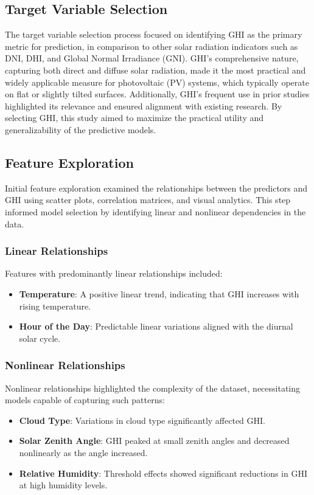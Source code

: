 \documentclass[10pt,twocolumn]{article}
\begin{document}
\begin{itemize}
\subsection{Target Variable Selection}
The target variable selection process focused on identifying GHI as the primary metric for prediction, in comparison to other solar radiation indicators such as DNI, DHI, and Global Normal Irradiance (GNI). GHI's comprehensive nature, capturing both direct and diffuse solar radiation, made it the most practical and widely applicable measure for photovoltaic (PV) systems, which typically operate on flat or slightly tilted surfaces\cite{6}. Additionally, GHI's frequent use in prior studies highlighted its relevance and ensured alignment with existing research. By selecting GHI, this study aimed to maximize the practical utility and generalizability of the predictive models.

\subsection{Feature Exploration}
Initial feature exploration examined the relationships between the predictors and GHI using scatter plots, correlation matrices, and visual analytics. This step informed model selection by identifying linear and nonlinear dependencies in the data.

\subsubsection{Linear Relationships}
Features with predominantly linear relationships included:
\begin{itemize}
    \item \textbf{Temperature}: A positive linear trend, indicating that GHI increases with rising temperature.
    \item \textbf{Hour of the Day}: Predictable linear variations aligned with the diurnal solar cycle.
\end{itemize}

\subsubsection{Nonlinear Relationships}
Nonlinear relationships highlighted the complexity of the dataset, necessitating models capable of capturing such patterns:
\begin{itemize}
    \item \textbf{Cloud Type}: Variations in cloud type significantly affected GHI.
    \item \textbf{Solar Zenith Angle}: GHI peaked at small zenith angles and decreased nonlinearly as the angle increased.
    \item \textbf{Relative Humidity}: Threshold effects showed significant reductions in GHI at high humidity levels.
\end{itemize}


\end{itemize}
\end{document}

